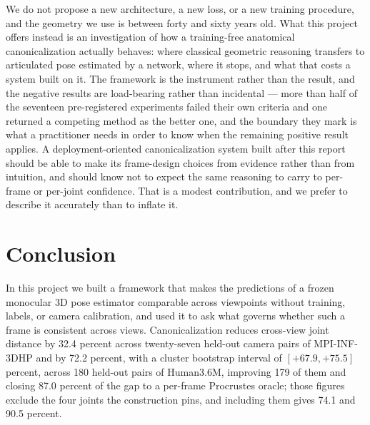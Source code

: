\documentclass[12pt,a4paper]{report}
\begin{document}
We do not propose a new architecture, a new loss, or a new training procedure, and the geometry we use is between forty and sixty years old. What this project offers instead is an investigation of how a training-free anatomical canonicalization actually behaves: where classical geometric reasoning transfers to articulated pose estimated by a network, where it stops, and what that costs a system built on it. The framework is the instrument rather than the result, and the negative results are load-bearing rather than incidental --- more than half of the seventeen pre-registered experiments failed their own criteria and one returned a competing method as the better one, and the boundary they mark is what a practitioner needs in order to know when the remaining positive result applies. A deployment-oriented canonicalization system built after this report should be able to make its frame-design choices from evidence rather than from intuition, and should know not to expect the same reasoning to carry to per-frame or per-joint confidence. That is a modest contribution, and we prefer to describe it accurately than to inflate it.

\section{Conclusion}

In this project we built a framework that makes the predictions of a frozen monocular 3D pose estimator comparable across viewpoints without training, labels, or camera calibration, and used it to ask what governs whether such a frame is consistent across views. Canonicalization reduces cross-view joint distance by 32.4 percent across twenty-seven held-out camera pairs of MPI-INF-3DHP and by 72.2 percent, with a cluster bootstrap interval of $[+67.9, +75.5]$ percent, across 180 held-out pairs of Human3.6M, improving 179 of them and closing 87.0 percent of the gap to a per-frame Procrustes oracle; those figures exclude the four joints the construction pins, and including them gives 74.1 and 90.5 percent.
\end{document}
